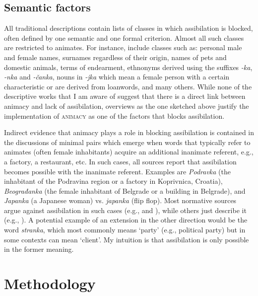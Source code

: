 \documentclass[output=paper,colorlinks,citecolor=brown]{langscibook}
\begin{document}
\subsection{Semantic factors}
\label{sim:subsec:semantic}

All traditional descriptions contain lists of classes in which assibilation is blocked, often defined by one semantic and one formal criterion. Almost all such classes are restricted to animates. For instance, \citet[92--93]{tevzak1992gramatika} include classes such as: personal male and female names, surnames regardless of their origin, names of pets and domestic animals, terms of endearment, ethnonyms derived using the suffixes \textit{-ka}, \textit{-nka} and \textit{-čanka}, nouns in \textit{-jka} which mean a female person with a certain characteristic or are derived from loanwords, and many others. While none of the descriptive works that I am aware of suggest that there is a direct link between animacy and lack of assibilation, overviews as the one sketched above justify the implementation of \textsc{animacy} as one of the factors that blocks assibilation. 

Indirect evidence that animacy plays a role in blocking assibilation is contained in the discussions of minimal pairs which emerge when words that typically refer to animates (often female inhabitants) acquire an additional inanimate referent, e.g., a factory, a restaurant, etc. In such cases, all sources report that assibilation becomes possible with the inanimate referent. Examples are \textit{Podravka} (the inhabitant of the Podravina region or a factory in Koprivnica, Croatia), \textit{Beograđanka} (the female inhabitant of Belgrade or a building in Belgrade), and \textit{Japanka} (a Japanese woman) vs. \textit{japanka} (flip flop). Most normative sources argue against assibilation in such cases (e.g., \citealt{hudevcek2022podravki} and \citealt[47]{pevsikan2010pravopis}), while others just describe it (e.g., \citealt[154]{Bar1995}). A potential example of an extension in the other direction would be the word \textit{stranka}, which most commonly means `party' (e.g., political party) but in some contexts can mean `client'. My intuition is that assibilation is only possible in the former meaning. 

\section{Methodology}
\label{sim:sec:methodology}
\end{document}
